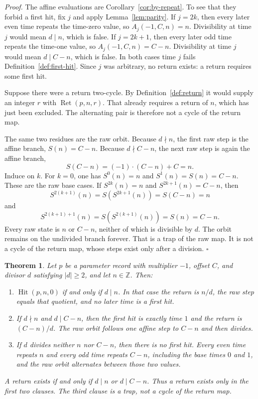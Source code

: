 \documentclass[11pt,letterpaper]{article}
\newcommand{\Z}{\mathbb{Z}}
\newtheorem{theorem}{Theorem}
\newenvironment{proof}{\noindent\textit{Proof.}}{\hfill\(\square\)}
\begin{document}
\begin{proof}
The affine evaluations are Corollary~\ref{cor:by-repeat}. To see that they
forbid a first hit, fix \(j\) and apply Lemma~\ref{lem:parity}. If \(j=2k\),
then every later even time repeats the time-zero value, so
\(A_j(-1,C,n)=n\). Divisibility at time \(j\) would mean \(d\mid n\), which
is false. If \(j=2k+1\), then every later odd time repeats the time-one
value, so \(A_j(-1,C,n)=C-n\). Divisibility at time \(j\) would mean
\(d\mid C-n\), which is false. In both cases time \(j\) fails
Definition~\ref{def:first-hit}. Since \(j\) was arbitrary, no return exists:
a return requires some first hit.

Suppose there were a return two-cycle. By Definition~\ref{def:return} it
would supply an integer \(r\) with \(\operatorname{Ret}(p,n,r)\). That already
requires a return of \(n\), which has just been excluded. The alternating
pair is therefore not a cycle of the return map.

The same two residues are the raw orbit. Because \(d\nmid n\), the first raw
step is the affine branch, \(S(n)=C-n\). Because \(d\nmid C-n\), the next
raw step is again the affine branch,
\[
S(C-n)=(-1)\cdot(C-n)+C=n.
\]
Induce on \(k\). For \(k=0\), one has \(S^{0}(n)=n\) and \(S^{1}(n)=S(n)=C-n\).
These are the raw base cases. If \(S^{2k}(n)=n\) and \(S^{2k+1}(n)=C-n\), then
\[
S^{2(k+1)}(n)=S(S^{2k+1}(n))=S(C-n)=n
\]
and
\[
S^{2(k+1)+1}(n)=S(S^{2(k+1)}(n))=S(n)=C-n.
\]
Every raw state is \(n\) or \(C-n\), neither of which is divisible by \(d\).
The orbit remains on the undivided branch forever. That is a trap of the raw
map. It is not a cycle of the return map, whose steps exist only after a
division.
\end{proof}

\begin{theorem}
\label{thm:reflection-hit}
Let \(p\) be a parameter record with multiplier \(-1\), offset \(C\), and
divisor \(d\) satisfying \(|d|\ge 2\), and let \(n\in\Z\). Then:
\begin{enumerate}
\item \(\operatorname{Hit}(p,n,0)\) if and only if \(d\mid n\). In that case
the return is \(n/d\), the raw step equals that quotient, and no later time
is a first hit.
\item If \(d\nmid n\) and \(d\mid C-n\), then the first hit is exactly time
\(1\) and the return is \((C-n)/d\). The raw orbit follows one affine step
to \(C-n\) and then divides.
\item If \(d\) divides neither \(n\) nor \(C-n\), then there is no first hit.
Every even time repeats \(n\) and every odd time repeats \(C-n\), including
the base times \(0\) and \(1\), and the raw orbit alternates between those
two values.
\end{enumerate}
A return exists if and only if \(d\mid n\) or \(d\mid C-n\). Thus a return
exists only in the first two clauses. The third clause is a trap, not a
cycle of the return map.
\end{theorem}
\end{document}
